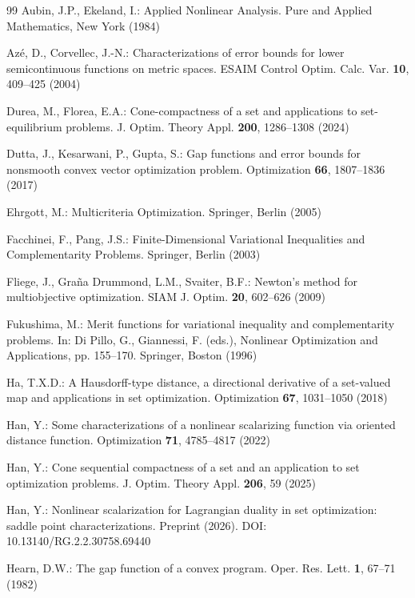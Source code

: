 \documentclass[11pt]{article}
\begin{document}
 \begin{thebibliography}{99}
 	 	 Aubin, J.P., Ekeland, I.: Applied Nonlinear Analysis. Pure and Applied Mathematics, New York (1984)
 	
 	 	 Azé, D., Corvellec, J.-N.: Characterizations of error bounds for lower semicontinuous functions on metric spaces. ESAIM Control Optim. Calc. Var. \textbf{10}, 409–425 (2004)
 	
 	
 	 Durea, M., Florea, E.A.: Cone-compactness of a set and applications to set-equilibrium problems. J. Optim. Theory Appl. \textbf{200}, 1286–1308 (2024)
 	
 	 Dutta, J., Kesarwani, P., Gupta, S.: Gap functions and error bounds for nonsmooth convex vector optimization problem. Optimization \textbf{66}, 1807–1836 (2017)
 	
 	 Ehrgott, M.: Multicriteria Optimization. Springer, Berlin (2005)
 	
 	 Facchinei, F., Pang, J.S.: Finite-Dimensional Variational Inequalities and Complementarity Problems. Springer, Berlin (2003)
 	
 	 Fliege, J., Graña Drummond, L.M., Svaiter, B.F.: Newton's method for multiobjective optimization. SIAM J. Optim. \textbf{20}, 602–626 (2009)
 	
 	 Fukushima, M.: Merit functions for variational inequality and complementarity problems. In: Di Pillo, G., Giannessi, F. (eds.), Nonlinear Optimization and Applications, pp. 155–170. Springer, Boston (1996)
 	
 	 Ha, T.X.D.: A Hausdorff-type distance, a directional derivative of a set-valued map and applications in set optimization. Optimization \textbf{67}, 1031–1050 (2018)
 	
 	 Han, Y.: Some characterizations of a nonlinear scalarizing function via oriented distance function. Optimization \textbf{71}, 4785–4817 (2022)
 	
 	 Han, Y.: Cone sequential compactness of a set and an application to set optimization problems. J. Optim. Theory Appl. \textbf{206}, 59 (2025)
 	
 	 Han, Y.: Nonlinear scalarization for Lagrangian duality in set optimization: saddle point characterizations. Preprint (2026). DOI: 10.13140/RG.2.2.30758.69440
 	
 	 Hearn, D.W.: The gap function of a convex program. Oper. Res. Lett. \textbf{1}, 67–71 (1982)
 	

\end{thebibliography}
\end{document}

